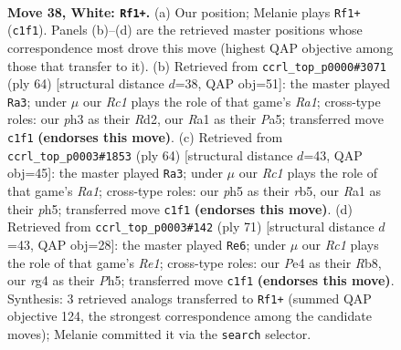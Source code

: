 \documentclass[11pt]{article}
\begin{document}
\clearpage

\begin{figure}[p]\centering
\begin{subfigure}{0.46\textwidth}\centering
\resizebox{\linewidth}{!}{%
\newchessgame
\chessboard[
  setfen={r7/pp3p2/5k2/3B3p/bP2P1r1/P6p/8/R1R4K w - - 2 38},
  showmover=false,
  pgfstyle=straightmove, color=movearrow, markmove={c1-f1}
]}
\caption{}
\end{subfigure}\hfill
\begin{subfigure}{0.46\textwidth}\centering
\resizebox{\linewidth}{!}{%
\newchessgame
\chessboard[
  setfen={1r4k1/5p2/b7/P3p1Pp/2r4P/6B1/1P1R4/R3K3 w Q - 7 33},
  showmover=false,
  pgfstyle=straightmove, color=movearrow, markmove={a1-a3}
]}
\caption{}
\end{subfigure}
\\[4pt]
\begin{subfigure}{0.46\textwidth}\centering
\resizebox{\linewidth}{!}{%
\newchessgame
\chessboard[
  setfen={r5k1/2B2p2/P4R2/1r2p1Pp/4b2P/8/8/R3K3 w Q - 1 33},
  showmover=false,
  pgfstyle=straightmove, color=movearrow, markmove={a1-a3}
]}
\caption{}
\end{subfigure}\hfill
\begin{subfigure}{0.46\textwidth}\centering
\resizebox{\linewidth}{!}{%
\newchessgame
\chessboard[
  setfen={1r2r1k1/5pP1/p4P2/1p1Rb2p/8/1NP4P/1K6/5R2 b - - 0 36},
  showmover=false,
  pgfstyle=straightmove, color=movearrow, markmove={e8-e6}
]}
\caption{}
\end{subfigure}
\caption{\textbf{Move 38, White: \texttt{Rf1+}.} (a) Our position; Melanie plays \texttt{Rf1+} (\texttt{c1f1}). Panels (b)--(d) are the retrieved master positions whose correspondence most drove this move (highest QAP objective among those that transfer to it). (b) Retrieved from \texttt{ccrl\_top\_p0000\#3071} (ply 64) [structural distance $d$=38, QAP obj=51]: the master played \texttt{Ra3}; under $\mu$ our \emph{Rc1} plays the role of that game's \emph{Ra1}; cross-type roles: our \emph{p}h3 as their \emph{R}d2, our \emph{R}a1 as their \emph{P}a5; transferred move \texttt{c1f1} \textbf{(endorses this move)}. (c) Retrieved from \texttt{ccrl\_top\_p0003\#1853} (ply 64) [structural distance $d$=43, QAP obj=45]: the master played \texttt{Ra3}; under $\mu$ our \emph{Rc1} plays the role of that game's \emph{Ra1}; cross-type roles: our \emph{p}h5 as their \emph{r}b5, our \emph{R}a1 as their \emph{p}h5; transferred move \texttt{c1f1} \textbf{(endorses this move)}. (d) Retrieved from \texttt{ccrl\_top\_p0003\#142} (ply 71) [structural distance $d$=43, QAP obj=28]: the master played \texttt{Re6}; under $\mu$ our \emph{Rc1} plays the role of that game's \emph{Re1}; cross-type roles: our \emph{P}e4 as their \emph{R}b8, our \emph{r}g4 as their \emph{P}h5; transferred move \texttt{c1f1} \textbf{(endorses this move)}. Synthesis: 3 retrieved analogs transferred to \texttt{Rf1+} (summed QAP objective 124, the strongest correspondence among the candidate moves); Melanie committed it via the \texttt{search} selector.}
\label{fig:thought-m74}
\end{figure}
\end{document}
